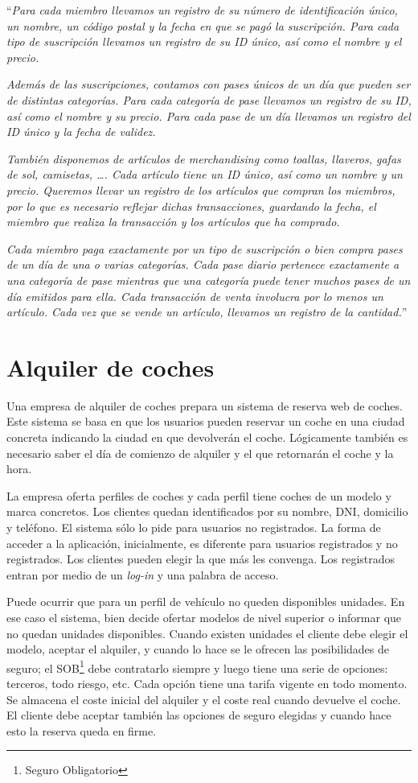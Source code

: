 \documentclass{db-practice}
\begin{document}
``\textit{Para cada miembro llevamos un registro de su número de identificación único, un nombre, un código postal y la fecha en que se pagó la suscripción. Para cada tipo de suscripción llevamos un registro de su ID único, así como el nombre y el precio.} 

\textit{Además de las suscripciones, contamos con pases únicos de un día que pueden ser de distintas categorías. Para cada categoría de pase llevamos un registro de su ID, así como el nombre y su precio. Para cada pase de un día llevamos un registro del ID único y la fecha de validez.}

\textit{También disponemos de artículos de merchandising como toallas, llaveros, gafas de sol, camisetas, \ldots. Cada artículo tiene un ID único, así como un nombre y un precio. Queremos llevar un registro de los artículos que compran los miembros, por lo que es necesario reflejar dichas transacciones, guardando la fecha, el miembro que realiza la transacción y los artículos que ha comprado.}

\textit{Cada miembro paga exactamente por un tipo de suscripción o bien compra pases de un día de una o varias categorías. Cada pase diario pertenece exactamente a una categoría de pase mientras que una categoría puede tener muchos pases de un día emitidos para ella. Cada transacción de venta involucra por lo menos un artículo. Cada vez que se vende un artículo, llevamos un registro de la cantidad.}''

\section{Alquiler de coches}
Una empresa de alquiler de coches prepara un sistema de reserva web de coches. Este sistema se basa en que los usuarios pueden reservar un coche en una ciudad concreta indicando la ciudad en que devolverán el coche. Lógicamente también es necesario saber el día de comienzo de alquiler y el que retornarán el coche y la hora. 

La empresa oferta perfiles de coches y cada perfil tiene coches de un modelo y marca concretos. Los clientes quedan identificados por su nombre, DNI, domicilio y teléfono. El sistema sólo lo pide para usuarios no registrados. La forma de acceder a la aplicación, inicialmente, es diferente para usuarios registrados y no registrados. Los clientes pueden elegir la que más les convenga. Los registrados entran por medio de un \textit{log-in} y una palabra de acceso.

Puede ocurrir que para un perfil de vehículo no queden disponibles unidades. En ese caso el sistema, bien decide ofertar modelos de nivel superior o informar que no quedan unidades disponibles. Cuando existen unidades el cliente debe elegir el modelo, aceptar el alquiler, y cuando lo hace se le ofrecen las posibilidades de seguro; el SOB\footnote{Seguro Obligatorio} debe contratarlo siempre y luego tiene una serie de opciones: terceros, todo riesgo, etc. Cada opción tiene una tarifa vigente en todo momento. Se almacena el coste inicial del alquiler y el coste real cuando devuelve el coche. El cliente debe aceptar también las opciones de seguro elegidas y cuando hace esto la reserva queda en firme. 
\end{document}
